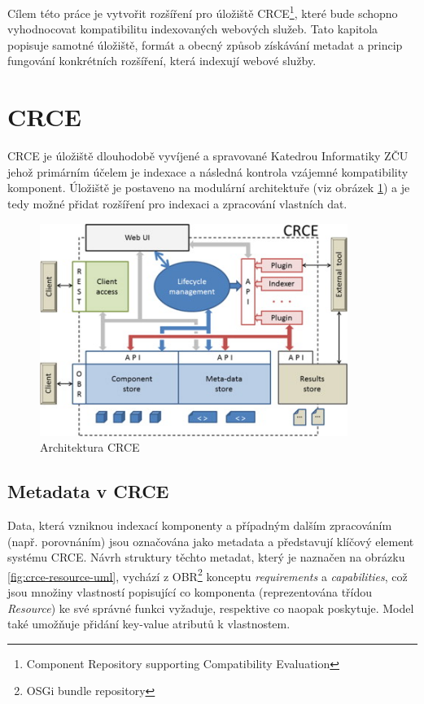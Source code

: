\documentclass[czech,DP]{thesiskiv}
\begin{document}
Cílem této práce je vytvořit rozšíření pro úložiště CRCE\footnote{Component Repository supporting Compatibility Evaluation}, které bude schopno vyhodnocovat kompatibilitu indexovaných webových služeb. Tato kapitola popisuje samotné úložiště, formát a obecný způsob získávání metadat a princip fungování konkrétních rozšíření, která indexují webové služby.

\section{CRCE}


CRCE je úložiště dlouhodobě vyvíjené a spravované Katedrou Informatiky ZČU jehož primárním účelem je indexace a následná kontrola vzájemné kompatibility komponent. Úložiště je postaveno na modulární architektuře (viz obrázek \ref{fig:crce-arch}) a je tedy možné přidat rozšíření pro indexaci a zpracování vlastních dat.

\begin{figure}[h]
	\centering
	\includegraphics[width=10cm]{crce-arch.jpg}
	\caption{Architektura CRCE}
	\label{fig:crce-arch}
\end{figure} 

\subsection{Metadata v CRCE}

Data, která vzniknou indexací komponenty a případným dalším zpracováním (např. porovnáním) jsou označována jako metadata a představují klíčový element systému CRCE. Návrh struktury těchto metadat, který je naznačen na obrázku \ref{fig:crce-resource-uml}, vychází z OBR\footnote{OSGi bundle repository} konceptu \textit{requirements} a \textit{capabilities}\cite{brada2015repository}, což jsou množiny vlastností popisující co komponenta (reprezentována třídou \textit{Resource}) ke své správné funkci vyžaduje, respektive co naopak poskytuje. Model také umožňuje přidání key-value atributů k vlastnostem.
 
\end{document}
